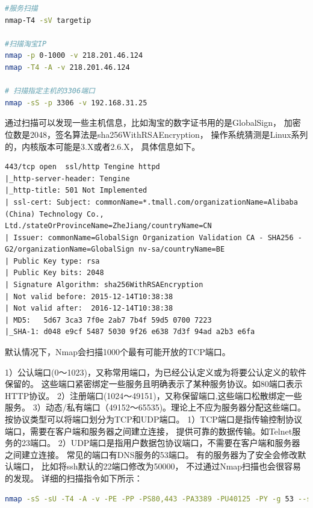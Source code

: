 \documentclass[12pt]{book}
\numberwithin{dummy}{section}
\theoremstyle{ocrenumbox}
\theoremstyle{blacknumex}
\theoremstyle{blacknumbox}
\theoremstyle{ocrenum}
\begin{document}
\begin{lstlisting}[language=Bash]
#服务扫描
nmap-T4 -sV targetip 

#扫描淘宝IP
nmap -p 0-1000 -v 218.201.46.124
nmap -T4 -A -v 218.201.46.124

# 扫描指定主机的3306端口
nmap -sS -p 3306 -v 192.168.31.25
\end{lstlisting}

通过扫描可以发现一些主机信息，比如淘宝的数字证书用的是GlobalSign，
加密位数是2048，签名算法是sha256WithRSAEncryption，
操作系统猜测是Linux系列的，内核版本可能是3.X或者2.6.X，
具体信息如下。

\begin{lstlisting}
443/tcp open  ssl/http Tengine httpd
|_http-server-header: Tengine
|_http-title: 501 Not Implemented
| ssl-cert: Subject: commonName=*.tmall.com/organizationName=Alibaba (China) Technology Co., Ltd./stateOrProvinceName=ZheJiang/countryName=CN
| Issuer: commonName=GlobalSign Organization Validation CA - SHA256 - G2/organizationName=GlobalSign nv-sa/countryName=BE
| Public Key type: rsa
| Public Key bits: 2048
| Signature Algorithm: sha256WithRSAEncryption
| Not valid before: 2015-12-14T10:38:38
| Not valid after:  2016-12-14T10:38:38
| MD5:   5d67 3ca3 7f0e 2ab7 7b4f 59d5 0700 7223
|_SHA-1: d048 e9cf 5487 5030 9f26 e638 7d3f 94ad a2b3 e6fa
\end{lstlisting}

默认情况下，Nmap会扫描1000个最有可能开放的TCP端口。

1）公认端口(0～1023)，又称常用端口，为已经公认定义或为将要公认定义的软件保留的。
这些端口紧密绑定一些服务且明确表示了某种服务协议。如80端口表示HTTP协议。
2）注册端口(1024～49151)，又称保留端口,这些端口松散绑定一些服务。
3）动态/私有端口（49152～65535)。理论上不应为服务器分配这些端口。
按协议类型可以将端口划分为TCP和UDP端口。
1）TCP端口是指传输控制协议端口，需要在客户端和服务器之间建立连接，
提供可靠的数据传输。如Telnet服务的23端口。
2）UDP端口是指用户数据包协议端口，不需要在客户端和服务器之间建立连接。
常见的端口有DNS服务的53端口。
有的服务器为了安全会修改默认端口，
比如将ssh默认的22端口修改为50000，
不过通过Nmap扫描也会很容易的发现。
详细的扫描指令如下所示：

\begin{lstlisting}[language=Bash]
nmap -sS -sU -T4 -A -v -PE -PP -PS80,443 -PA3389 -PU40125 -PY -g 53 --script "default or (discovery and safe)" 12.26.32.14 
\end{lstlisting}
\end{document}
